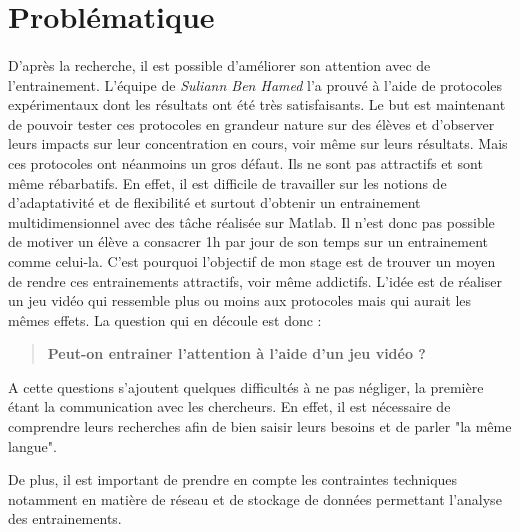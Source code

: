 \section{Problématique}

\paragraph{}D'après la recherche, il est possible d'améliorer son attention avec de l'entrainement. L'équipe de \emph{Suliann Ben Hamed} l'a prouvé à l'aide de protocoles expérimentaux
dont les résultats ont été très satisfaisants. Le but est maintenant de pouvoir tester ces protocoles en grandeur nature sur des élèves et d'observer leurs impacts sur leur
concentration en cours, voir même sur leurs résultats. Mais ces protocoles ont néanmoins un gros défaut. Ils ne sont pas attractifs et sont même rébarbatifs. En effet, il est difficile
de travailler sur les notions de d'adaptativité et de flexibilité et surtout d'obtenir un entrainement multidimensionnel avec des tâche réalisée sur \gls{Matlab}. Il n'est donc pas
possible de motiver un élève a consacrer 1h par jour de son temps sur un entrainement comme celui-la. C'est pourquoi l'objectif de mon stage est de trouver un moyen de rendre ces
entrainements attractifs, voir même addictifs. L'idée est de réaliser un jeu vidéo qui ressemble plus ou moins aux protocoles mais qui aurait les mêmes effets. La question qui en
découle est donc :
\begin{quote}
\textbf{Peut-on entrainer l'attention à l'aide d'un jeu vidéo ?}
\end{quote}

A cette questions s'ajoutent quelques difficultés à ne pas négliger, la première étant la communication avec les chercheurs. En effet, il est nécessaire de comprendre leurs
recherches afin de bien saisir leurs besoins et de parler "la même langue".

De plus, il est important de prendre en compte les contraintes techniques notamment en matière de réseau et de stockage de données permettant l'analyse des entrainements.


\newpage